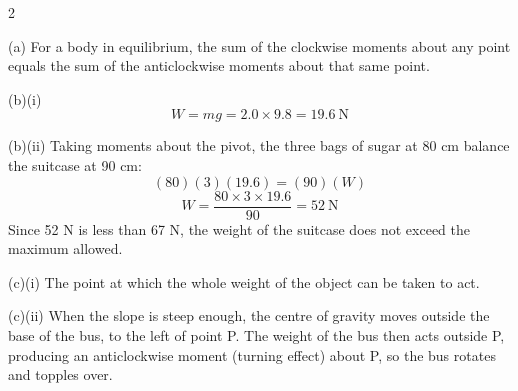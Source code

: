 \begin{question}{2}
\markscheme
{}
\endms

\exemplar
(a) For a body in equilibrium, the sum of the clockwise moments about any point equals the sum of the anticlockwise moments about that same point.

(b)(i) $$ W = mg = 2.0 \times 9.8 = 19.6\ \text{N} $$

(b)(ii) Taking moments about the pivot, the three bags of sugar at 80 cm balance the suitcase at 90 cm:
$$ (80)(3)(19.6) = (90)(W) $$
$$ W = \frac{80 \times 3 \times 19.6}{90} = 52\ \text{N} $$
Since 52 N is less than 67 N, the weight of the suitcase does not exceed the maximum allowed.

(c)(i) The point at which the whole weight of the object can be taken to act.

(c)(ii) When the slope is steep enough, the centre of gravity moves outside the base of the bus, to the left of point P. The weight of the bus then acts outside P, producing an anticlockwise moment (turning effect) about P, so the bus rotates and topples over.
\endexemplar
\end{question}

